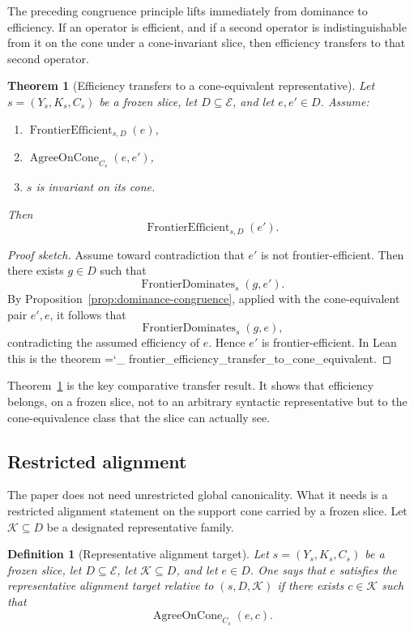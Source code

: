 \documentclass[11pt]{article}
\newtheorem{theorem}{Theorem}
\newtheorem{definition}{Definition}
\newcommand{\lid}[1]{{\small\ttfamily\hyphenchar\font=`\_ #1}}
\begin{document}
The preceding congruence principle lifts immediately from dominance to efficiency. If an operator is efficient, and if a second operator is indistinguishable from it on the cone under a cone-invariant slice, then efficiency transfers to that second operator.

\begin{theorem}[Efficiency transfers to a cone-equivalent representative]\label{thm:efficiency-transfer}
Let \(s=(Y_s,K_s,C_s)\) be a frozen slice, let \(D\subseteq \mathcal{E}\), and let \(e,e'\in D\). Assume:
\begin{enumerate}
\item \(\operatorname{FrontierEfficient}_{s,D}(e)\),
\item \(\operatorname{AgreeOnCone}_{C_s}(e,e')\),
\item \(s\) is invariant on its cone.
\end{enumerate}
Then
\[
\operatorname{FrontierEfficient}_{s,D}(e').
\]
\end{theorem}

\begin{proof}[Proof sketch]
Assume toward contradiction that \(e'\) is not frontier-efficient. Then there exists \(g\in D\) such that
\[
\operatorname{FrontierDominates}_s(g,e').
\]
By Proposition~\ref{prop:dominance-congruence}, applied with the cone-equivalent pair \(e',e\), it follows that
\[
\operatorname{FrontierDominates}_s(g,e),
\]
contradicting the assumed efficiency of \(e\). Hence \(e'\) is frontier-efficient. In Lean this is the theorem \lid{frontier\_efficiency\_transfer\_to\_cone\_equivalent}.
\end{proof}

Theorem~\ref{thm:efficiency-transfer} is the key comparative transfer result. It shows that efficiency belongs, on a frozen slice, not to an arbitrary syntactic representative but to the cone-equivalence class that the slice can actually see.

\subsection*{Restricted alignment}

The paper does not need unrestricted global canonicality. What it needs is a restricted alignment statement on the support cone carried by a frozen slice. Let \(\mathcal{K}\subseteq D\) be a designated representative family.

\begin{definition}[Representative alignment target]\label{def:alignment-target}
Let \(s=(Y_s,K_s,C_s)\) be a frozen slice, let \(D\subseteq\mathcal{E}\), let \(\mathcal{K}\subseteq D\), and let \(e\in D\). One says that \(e\) satisfies the representative alignment target relative to \((s,D,\mathcal{K})\) if there exists \(c\in \mathcal{K}\) such that
\[
\operatorname{AgreeOnCone}_{C_s}(e,c).
\]
\end{definition}
\end{document}
